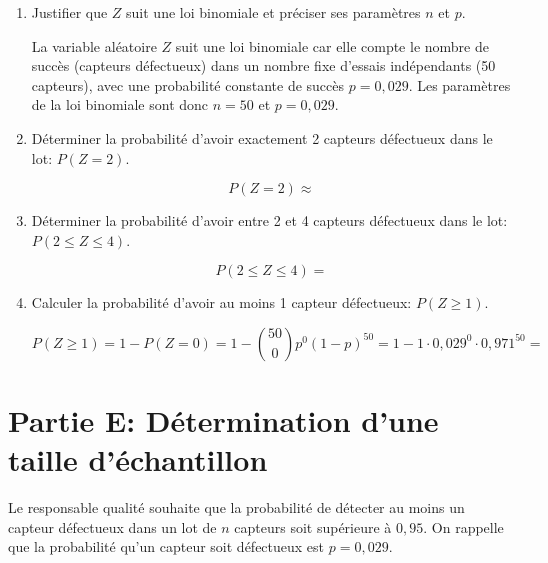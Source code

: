 \documentclass[11pt, a4paper]{report}
\begin{document}
\begin{enumerate}[resume]
    \item Justifier que $Z$ suit une loi binomiale et préciser ses paramètres $n$ et $p$.
    \begin{blocvisible}[height=4]
        La variable aléatoire $Z$ suit une loi binomiale car elle compte le nombre de succès (capteurs défectueux) dans un nombre fixe d'essais indépendants (50 capteurs), avec une probabilité constante de succès $p = 0,029$. Les paramètres de la loi binomiale sont donc $n = 50$ et $p = 0,029$.
    \end{blocvisible}

        \medskip

    \item Déterminer la probabilité d'avoir exactement 2 capteurs défectueux dans le lot: $P(Z = 2)$.
    \begin{blocvisible}[height=1]
\[P(Z = 2)  \approx \]
    \end{blocvisible}
    \medskip

    \item Déterminer la probabilité d'avoir entre 2 et 4 capteurs défectueux dans le lot: $P(2 \leq Z \leq 4)$.
    \begin{blocvisible}[height=1]
\[P(2 \leq Z \leq 4) = \]
    \end{blocvisible}
        \medskip
\item Calculer la probabilité d'avoir au moins 1 capteur défectueux: $P(Z \geq 1)$.
    \begin{blocvisible}[height=1.5]
\[P(Z \geq 1) = 1 - P(Z = 0) = 1 - \binom{50}{0} p^0 {(1-p)}^{50} = 1 - 1 \cdot 0,029^0 \cdot 0,971^{50} =\]
    \end{blocvisible}
    
\end{enumerate}

\section*{Partie E\@: Détermination d'une taille d'échantillon}

Le responsable qualité souhaite que la probabilité de détecter au moins un capteur défectueux dans un lot de $n$ capteurs soit supérieure à $0,95$. On rappelle que la probabilité qu'un capteur soit défectueux est $p = 0,029$.
\end{document}
